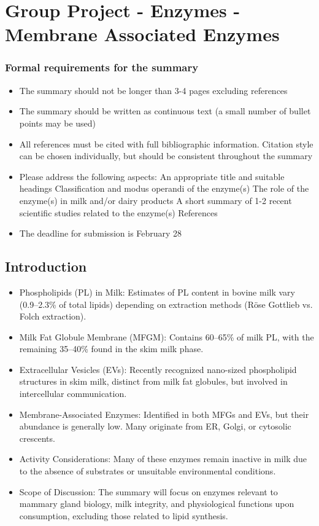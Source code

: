 \chapter{Group Project - Enzymes - Membrane Associated Enzymes}
\setlength{\headheight}{12.71342pt}
\addtolength{\topmargin}{-0.71342pt}

\subsection*{Formal requirements for the summary}

\begin{itemize}
    \item The summary should not be longer than 3-4 pages excluding references
    \item The summary should be written as continuous text (a small number of bullet points may be used)
    \item All references must be cited with full bibliographic information. Citation style can be chosen individually, but should be consistent throughout the summary
    \item Please address the following aspects:
    \subitem An appropriate title and suitable headings
    \subitem Classification and modus operandi of the enzyme(s)
    \subitem The role of the enzyme(s) in milk and/or dairy products
    \subitem A short summary of 1-2 recent scientific studies related to the enzyme(s)
    \subitem References
    \item The deadline for submission is February 28
\end{itemize}

\section{Introduction}
\begin{itemize}
    \item Phospholipids (PL) in Milk: Estimates of PL content in bovine milk vary (0.9–2.3\% of total lipids) depending on extraction methods (Röse Gottlieb vs. Folch extraction).
    \item Milk Fat Globule Membrane (MFGM): Contains 60–65\% of milk PL, with the remaining 35–40\% found in the skim milk phase.
    \item Extracellular Vesicles (EVs): Recently recognized nano-sized phospholipid structures in skim milk, distinct from milk fat globules, but involved in intercellular communication.
    \item Membrane-Associated Enzymes: Identified in both MFGs and EVs, but their abundance is generally low. Many originate from ER, Golgi, or cytosolic crescents.
    \item Activity Considerations: Many of these enzymes remain inactive in milk due to the absence of substrates or unsuitable environmental conditions.
    \item Scope of Discussion: The summary will focus on enzymes relevant to mammary gland biology, milk integrity, and physiological functions upon consumption, excluding those related to lipid synthesis.
\end{itemize}

